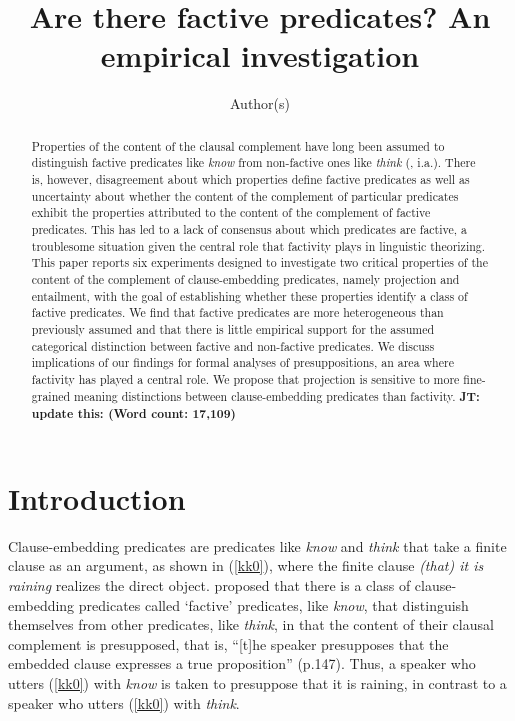 \documentclass[11pt,fleqn]{article}
\title{Are there factive predicates? An empirical investigation}
\author{Author(s)}
\newcommand{\6}{\mbox{$[\hspace*{-.6mm}[$}}
\newcommand{\9}{\mbox{$]\hspace*{-.6mm}]$}}
\newcommand{\jt}[1]{\textbf{\color{blue}JT: #1}}
\begin{document}

\maketitle

\vspace*{-1cm}

\begin{abstract}

Properties of the content of the clausal complement have long been assumed to distinguish factive predicates like {\em know} from non-factive ones like {\em think} (\citealt{kiparsky-kiparsky70}, i.a.). There is, however, disagreement about which properties define factive predicates as well as uncertainty about whether the content of the complement of particular predicates exhibit the properties attributed to the content of the complement of factive predicates. This has led to a lack of consensus about which predicates are factive, a troublesome situation given the central role that factivity plays in linguistic theorizing. This paper reports six experiments designed to investigate two critical properties of the content of the complement of clause-embedding predicates, namely projection and entailment, with the goal of establishing whether these properties identify a class of factive predicates. We find that factive predicates are more heterogeneous than previously assumed and that there is little empirical support for the assumed categorical distinction between factive and non-factive predicates. We discuss implications of our findings for formal analyses of presuppositions, an area where factivity has played a central role. We propose that projection is sensitive to more fine-grained meaning distinctions between clause-embedding predicates than factivity. \jt{update this: (Word count: 17,109)}

\end{abstract}
		
\section{Introduction}\label{s1}

Clause-embedding predicates are predicates like {\em know} and {\em think} that take a finite clause as an argument, as shown in (\ref{kk0}), where the finite clause {\em (that) it is raining} realizes the direct object. \citealt{kiparsky-kiparsky70} proposed that there is a  class of clause-embedding predicates called `factive' predicates, like {\em know}, that distinguish themselves from other predicates, like {\em think}, in that the content of their clausal complement is presupposed, that is, ``[t]he speaker presupposes that the embedded clause expresses a true proposition'' (p.147). Thus, a speaker who utters (\ref{kk0}) with {\em know} is taken to presuppose that it is raining, in contrast to a speaker who utters (\ref{kk0}) with {\em think}.
\end{document}
